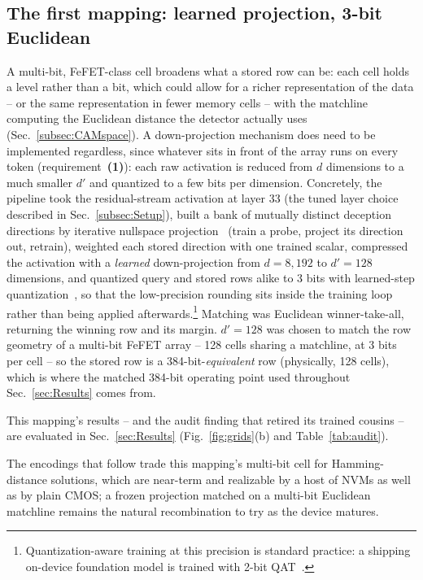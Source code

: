 \documentclass[conference]{IEEEtran}
\newcommand{\fefet}{{FeFET}\xspace}
\begin{document}
\subsection{The first mapping: learned projection, 3-bit Euclidean}
\label{subsec:FirstPipeline}
A multi-bit, \fefet-class cell broadens what a stored row can be:
each cell holds a level rather than a bit, which could allow for a
richer representation of the data -- or the same representation in
fewer memory cells -- with the matchline computing the Euclidean
distance the detector actually uses (Sec.~\ref{subsec:CAMspace}). A
down-projection mechanism does need to be implemented regardless,
since whatever sits in front of the array runs on every token
(requirement~{\bf (1)}): each raw activation is reduced from $d$
dimensions to a much smaller $d'$ and quantized to a few bits per
dimension.
Concretely, the pipeline took the residual-stream
activation at layer 33 (the tuned layer choice described in
Sec.~\ref{subsec:Setup}), built a bank of mutually distinct deception
directions by iterative nullspace
projection~\cite{ravfogel2020inlp} (train a probe, project its direction
out, retrain), weighted each stored direction with one trained scalar,
compressed the activation with a \emph{learned} down-projection from
$d=8{,}192$ to $d'=128$ dimensions, and quantized query and stored rows
alike to 3 bits with learned-step quantization~\cite{esser2020lsq}, so
that the low-precision rounding sits inside the training loop rather
than being applied afterwards.\footnote{Quantization-aware training at
this precision is standard practice: a shipping on-device foundation
model is trained with 2-bit QAT~\cite{apple2025foundation}.} Matching
was Euclidean winner-take-all, returning the winning row and its
margin. $d'=128$ was chosen to match the row geometry of a multi-bit
\fefet array -- 128 cells sharing a matchline, at 3 bits per cell --
so the stored row is a 384-bit-\emph{equivalent} row (physically, 128
cells), which is where the matched 384-bit operating point used
throughout Sec.~\ref{sec:Results} comes
from.

This mapping's results -- and the audit finding that retired its
trained cousins -- are evaluated in Sec.~\ref{sec:Results}
(Fig.~\ref{fig:grids}(b) and
Table~\ref{tab:audit}).

\label{subsec:PathBack}%
The encodings that follow trade this mapping's multi-bit cell for
Hamming-distance solutions, which are near-term and realizable by a
host of NVMs as well as by plain CMOS; a frozen projection matched on
a multi-bit Euclidean matchline remains the natural recombination to
try as the device matures.
\end{document}
